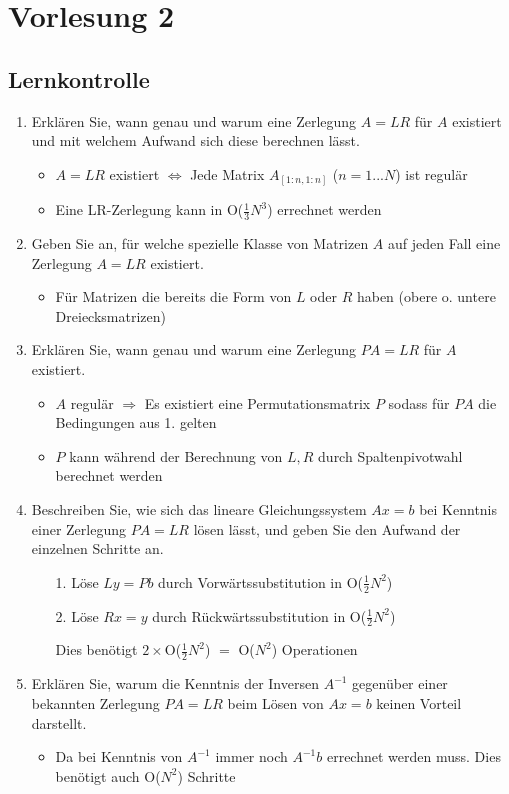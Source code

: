 \documentclass[]{article}
\begin{document}
\section{Vorlesung 2}
\subsection{Lernkontrolle}
	\begin{enumerate}
		\item Erklären Sie, wann genau und warum eine Zerlegung $A=LR$ für $A$ existiert und mit welchem Aufwand sich diese berechnen lässt.
			\begin{itemize}
				\item $A = LR$ existiert $\Leftrightarrow$ Jede Matrix $A_{[1:n,1:n]}$ ($n = 1...N$) ist regulär
				\item Eine LR-Zerlegung kann in O($\frac{1}{3} N^3$) errechnet werden
			\end{itemize}
		\item Geben Sie an, für welche spezielle Klasse von Matrizen $A$ auf jeden Fall eine Zerlegung $A=LR$ existiert.
			\begin{itemize}
				\item Für Matrizen die bereits die Form von $L$ oder $R$ haben (obere o. untere Dreiecksmatrizen)
			\end{itemize}
		\item Erklären Sie, wann genau und warum eine Zerlegung $PA=LR$ für $A$ existiert.
			\begin{itemize}
				\item $A$ regulär $\Rightarrow$ Es existiert eine Permutationsmatrix $P$ sodass für $PA$ die Bedingungen aus 1. gelten
				\item $P$ kann während der Berechnung von $L, R$ durch Spaltenpivotwahl berechnet werden
			\end{itemize}
		\item Beschreiben Sie, wie sich das lineare Gleichungssystem $Ax=b$ bei Kenntnis einer Zerlegung $PA=LR$ lösen lässt, und geben Sie den Aufwand der einzelnen Schritte an.
			\begin{enumerate}
				\item[1.] Löse $Ly = Pb$ durch Vorwärtssubstitution in O($\frac{1}{2} N^2$)
				\item[2.] Löse $Rx = y$ durch Rückwärtssubstitution in O($\frac{1}{2} N^2$)
				\item[  ] Dies benötigt $2 \times$O($\frac{1}{2} N^2$) $=$ O($N^2$) Operationen
			\end{enumerate}
		\item Erklären Sie, warum die Kenntnis der Inversen $A^{-1}$ gegenüber einer bekannten Zerlegung $PA = LR$ beim Lösen von $Ax = b$ keinen Vorteil darstellt.
			\begin{itemize}
				\item Da bei Kenntnis von $A^{-1}$ immer noch $A^{-1} b$ errechnet werden muss. Dies benötigt auch O($N^2$) Schritte
			\end{itemize}
	\end{enumerate}
\end{document}
